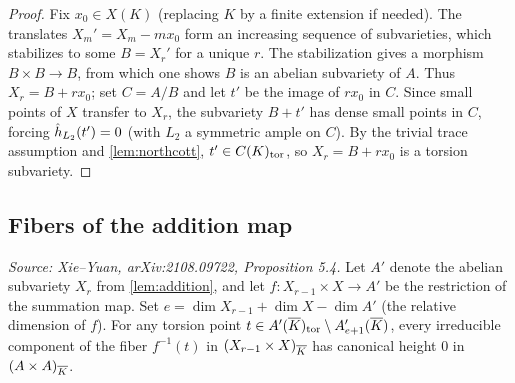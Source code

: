 \begin{proof}
  Fix \(x_0 \in X(K)\) (replacing \(K\) by a finite extension if needed).
  The translates \(X_m' = X_m - mx_0\) form an increasing sequence of subvarieties, which
  stabilizes to some \(B = X_r'\) for a unique \(r\).
  The stabilization gives a morphism \(B \times B \to B\), from which one shows \(B\) is an
  abelian subvariety of \(A\).
  Thus \(X_r = B + rx_0\); set \(C = A/B\) and let \(t'\) be the image of \(rx_0\) in \(C\).
  Since small points of \(X\) transfer to \(X_r\), the subvariety \(B + t'\) has dense small
  points in \(C\), forcing \(\hat{h}_{L_2}(t')=0\) (with \(L_2\) a symmetric ample on \(C\)).
  By the trivial trace assumption and \cref{lem:northcott}, \(t' \in C(K)_{\rm tor}\), so
  \(X_r = B + rx_0\) is a torsion subvariety.
\end{proof}

\subsection{Fibers of the addition map}

\begin{proposition}
  \label{pro:torsionFiber}
  \textit{Source: Xie--Yuan, arXiv:2108.09722, Proposition 5.4.}
  Let \(A'\) denote the abelian subvariety \(X_r\) from \cref{lem:addition}, and let
  \(f\colon X_{r-1} \times X \to A'\) be the restriction of the summation map.
  Set \(e = \dim X_{r-1} + \dim X - \dim A'\) (the relative dimension of \(f\)).
  For any torsion point \(t \in A'(\overline{K})_{\rm tor} \setminus A'_{e+1}(\overline{K})\), every
  irreducible component of the fiber \(f^{-1}(t)\) in \((X_{r-1} \times X)_{\overline{K}}\) has
  canonical height \(0\) in \((A \times A)_{\overline{K}}\).
\end{proposition}

